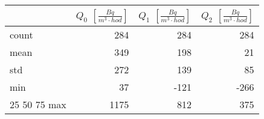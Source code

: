 \begin{tabular}{lrrr}
\toprule
{} &  $Q_0$ $\left[\si{\frac{Bq}{m^3\cdot hod}}\right]$ &  $Q_1$ $\left[\si{\frac{Bq}{m^3\cdot hod}}\right]$ &  $Q_2$ $\left[\si{\frac{Bq}{m^3\cdot hod}}\right]$ \\
\midrule
count &                                                284 &                                                284 &                                                284 \\
mean  &                                                349 &                                                198 &                                                 21 \\
std   &                                                272 &                                                139 &                                                 85 \\
min   &                                                 37 &                                               -121 &                                               -266 \\
25%
50%
75%
max   &                                               1175 &                                                812 &                                                375 \\
\bottomrule
\end{tabular}
